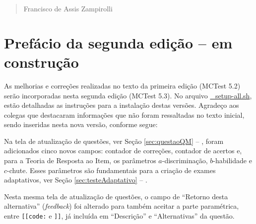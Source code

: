\begin{verse}
    \vspace*{2mm}
	\begin{flushright}
		Francisco de Assis Zampirolli\\
            \date{7 de setembro de 2023}
	\end{flushright}
\end{verse}

\newpage


\section*{Prefácio da segunda edição -- em construção}

As melhorias e correções realizadas no texto da primeira edição (MCTest 5.2) serão incorporadas nesta segunda edição (MCTest 5.3). No arquivo \href{https://github.com/fzampirolli/mctest/blob/master/_setup-all.sh}{\_setup-all.sh}, estão detalhadas as instruções para a instalação destas versões. Agradeço aos colegas que destacaram informações que não foram ressaltadas no texto inicial, sendo inseridas nesta nova versão, conforme segue:


Na tela de atualização de questões, ver Seção \ref{sec:questaoQM} -- , foram adicionados cinco novos campos: contador de correções, contador de acertos e, para a Teoria de Resposta ao Item, os parâmetros \(a\)-discriminação, \(b\)-habilidade e \(c\)-chute. Esses parâmetros são fundamentais para a criação de exames adaptativos, ver Seção \ref{sec:testeAdaptativo} -- . 

Nesta mesma tela de atualização de questões, o campo de ``Retorno desta alternativa'' (\textit{feedback}) foi alterado para também aceitar a parte paramétrica, entre \verb|[[code:| e \verb|]]|, já incluída em ``Descrição'' e ``Alternativas'' da questão.


